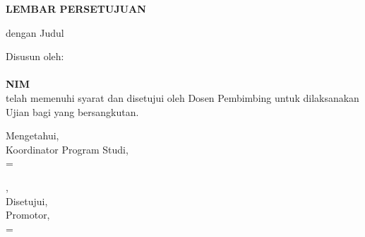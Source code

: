 
\newpage

\newcommand{\smartsignature}[2]{%
    \setbox0=\hbox{#1}%
    \ifdim\wd0>0.47\textwidth
        {\small #1\\[0.3em]#2}%
    \else
        {#1\\[0.3em]#2}%
    \fi
}

\begin{center}
    \begin{doublespace}
        \textbf{\large \MakeUppercase{lembar persetujuan}}
    \end{doublespace}
\end{center}

\begin{center}
    {\tipe} dengan Judul
\end{center}

\begin{center}
    \begin{doublespace}
        \textbf{\large \MakeUppercase {\judulid}}
    \end{doublespace}
\end{center}

\begin{center}
    Disusun oleh:\\
    \textbf{\penulis}\\
    \textbf{NIM \nim}\\[1.5cm]

    telah memenuhi syarat dan disetujui oleh Dosen Pembimbing untuk dilaksanakan Ujian {\tipe} bagi yang bersangkutan.\\[0.75cm]
\end{center}

\vspace{0.75cm}
\noindent\begin{minipage}[t]{0.47\textwidth}
    \centering
    \vspace{1.5em}
    Mengetahui,\\
    Koordinator Program Studi,\\[2.5cm]
    
    \smartsignature{\koorprodi}{NIP. \NIPkoorprodi}
\end{minipage}%
\hfill%
\begin{minipage}[t]{0.47\textwidth}
    \centering
    \kota, \tglpersetujuan\\[1em]
    Disetujui,\\
    Promotor,\\[2.5cm]
    
    \smartsignature{\pembimbing}{NIP. \NIPpembimbing}
\end{minipage}%
